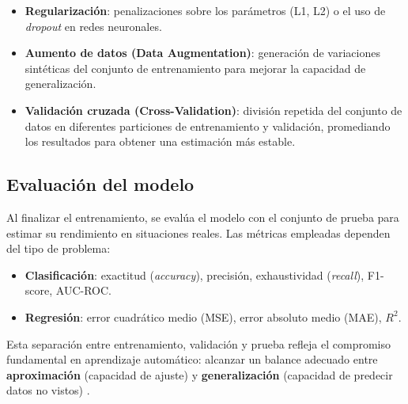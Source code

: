 \begin{itemize}
\item \textbf{Regularización}: penalizaciones sobre los parámetros (L1, L2) o el uso de \textit{dropout} en redes neuronales.
\item \textbf{Aumento de datos (Data Augmentation)}: generación de variaciones sintéticas del conjunto de entrenamiento para mejorar la capacidad de generalización.
\item \textbf{Validación cruzada (Cross-Validation)}: división repetida del conjunto de datos en diferentes particiones de entrenamiento y validación, promediando los resultados para obtener una estimación más estable.
\end{itemize}

\subsection*{Evaluación del modelo}
Al finalizar el entrenamiento, se evalúa el modelo con el conjunto de prueba para estimar su rendimiento en situaciones reales. Las métricas empleadas dependen del tipo de problema:
\begin{itemize}
\item \textbf{Clasificación}: exactitud (\textit{accuracy}), precisión, exhaustividad (\textit{recall}), F1-score, AUC-ROC.
\item \textbf{Regresión}: error cuadrático medio (MSE), error absoluto medio (MAE), $R^2$.
\end{itemize}

Esta separación entre entrenamiento, validación y prueba refleja el compromiso fundamental en aprendizaje automático: alcanzar un balance adecuado entre \textbf{aproximación} (capacidad de ajuste) y \textbf{generalización} (capacidad de predecir datos no vistos) \cite{Mostafa2012}.